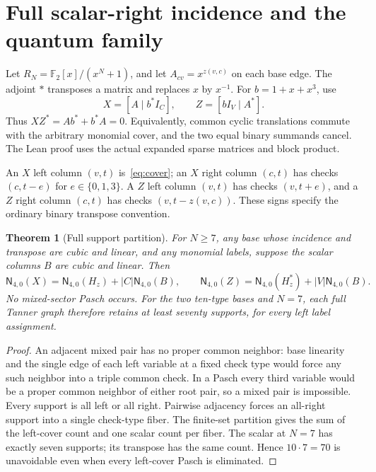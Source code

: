 \documentclass[11pt]{article}
\newtheorem{theorem}{Theorem}[section]
\newcommand{\F}{\mathbb F_2}
\newcommand{\Nf}{\mathsf N_{4,0}}
\begin{document}
\section{Full scalar-right incidence and the quantum family}
Let $R_N=\F[x]/(x^N+1)$, and let $A_{cv}=x^{z(v,c)}$ on each base edge.
The adjoint $*$ transposes a matrix and replaces $x$ by $x^{-1}$. For
$b=1+x+x^3$, use
\begin{equation}\label{eq:css}
 X=[A\mid b^*I_C],\qquad Z=[bI_V\mid A^*].
\end{equation}
Thus $XZ^*=Ab^*+b^*A=0$. Equivalently, common cyclic translations commute
with the arbitrary monomial cover, and the two equal binary summands cancel.
The Lean proof uses the actual expanded sparse matrices and block product.

An $X$ left column $(v,t)$ is~\eqref{eq:cover}; an $X$ right column $(c,t)$
has checks $(c,t-e)$ for $e\in\{0,1,3\}$. A $Z$ left column $(v,t)$ has
checks $(v,t+e)$, and a $Z$ right column $(c,t)$ has checks $(v,t-z(v,c))$.
These signs specify the ordinary binary transpose convention.

\begin{theorem}[Full support partition]\label{thm:full}
For $N\geq7$, any base whose incidence and transpose are cubic and linear, and any
monomial labels, suppose the scalar columns $B$ are cubic and linear. Then
\begin{equation}\label{eq:full}
 \Nf(X)=\Nf(H_z)+|C|\Nf(B),\qquad
 \Nf(Z)=\Nf(H^*_{z})+|V|\Nf(B).
\end{equation}
No mixed-sector Pasch occurs. For the two ten-type bases and $N=7$, each full
Tanner graph therefore retains at least seventy supports, for every left label
assignment.
\end{theorem}
\begin{proof}
An adjacent mixed pair has no proper common neighbor: base linearity and the
single edge of each left variable at a fixed check type would force any such
neighbor into a triple common check. In a Pasch every third variable would be
a proper common neighbor of either root pair, so a mixed pair is impossible.
Every support is all left or all right. Pairwise adjacency forces an all-right
support into a single check-type fiber. The finite-set partition gives the
sum of the left-cover count and one scalar count per fiber. The scalar at
$N=7$ has exactly seven supports; its transpose has the same count. Hence
$10\cdot7=70$ is unavoidable even when every left-cover Pasch is eliminated.
\end{proof}
\end{document}
